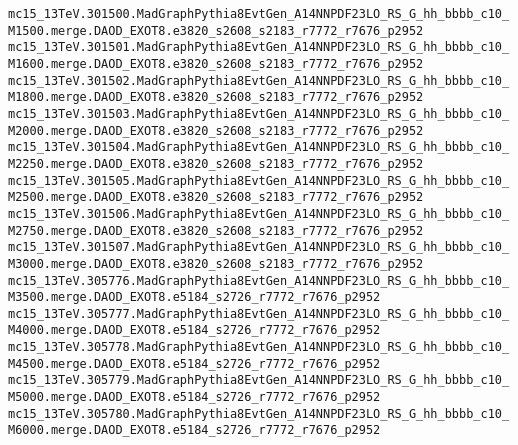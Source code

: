 {\verb|mc15_13TeV.301500.MadGraphPythia8EvtGen_A14NNPDF23LO_RS_G_hh_bbbb_c10_M1500.merge.DAOD_EXOT8.e3820_s2608_s2183_r7772_r7676_p2952|\\
\verb|mc15_13TeV.301501.MadGraphPythia8EvtGen_A14NNPDF23LO_RS_G_hh_bbbb_c10_M1600.merge.DAOD_EXOT8.e3820_s2608_s2183_r7772_r7676_p2952|\\
\verb|mc15_13TeV.301502.MadGraphPythia8EvtGen_A14NNPDF23LO_RS_G_hh_bbbb_c10_M1800.merge.DAOD_EXOT8.e3820_s2608_s2183_r7772_r7676_p2952|\\
\verb|mc15_13TeV.301503.MadGraphPythia8EvtGen_A14NNPDF23LO_RS_G_hh_bbbb_c10_M2000.merge.DAOD_EXOT8.e3820_s2608_s2183_r7772_r7676_p2952|\\
\verb|mc15_13TeV.301504.MadGraphPythia8EvtGen_A14NNPDF23LO_RS_G_hh_bbbb_c10_M2250.merge.DAOD_EXOT8.e3820_s2608_s2183_r7772_r7676_p2952|\\
\verb|mc15_13TeV.301505.MadGraphPythia8EvtGen_A14NNPDF23LO_RS_G_hh_bbbb_c10_M2500.merge.DAOD_EXOT8.e3820_s2608_s2183_r7772_r7676_p2952|\\
\verb|mc15_13TeV.301506.MadGraphPythia8EvtGen_A14NNPDF23LO_RS_G_hh_bbbb_c10_M2750.merge.DAOD_EXOT8.e3820_s2608_s2183_r7772_r7676_p2952|\\
\verb|mc15_13TeV.301507.MadGraphPythia8EvtGen_A14NNPDF23LO_RS_G_hh_bbbb_c10_M3000.merge.DAOD_EXOT8.e3820_s2608_s2183_r7772_r7676_p2952|\\
\verb|mc15_13TeV.305776.MadGraphPythia8EvtGen_A14NNPDF23LO_RS_G_hh_bbbb_c10_M3500.merge.DAOD_EXOT8.e5184_s2726_r7772_r7676_p2952|\\
\verb|mc15_13TeV.305777.MadGraphPythia8EvtGen_A14NNPDF23LO_RS_G_hh_bbbb_c10_M4000.merge.DAOD_EXOT8.e5184_s2726_r7772_r7676_p2952|\\
\verb|mc15_13TeV.305778.MadGraphPythia8EvtGen_A14NNPDF23LO_RS_G_hh_bbbb_c10_M4500.merge.DAOD_EXOT8.e5184_s2726_r7772_r7676_p2952|\\
\verb|mc15_13TeV.305779.MadGraphPythia8EvtGen_A14NNPDF23LO_RS_G_hh_bbbb_c10_M5000.merge.DAOD_EXOT8.e5184_s2726_r7772_r7676_p2952|\\
\verb|mc15_13TeV.305780.MadGraphPythia8EvtGen_A14NNPDF23LO_RS_G_hh_bbbb_c10_M6000.merge.DAOD_EXOT8.e5184_s2726_r7772_r7676_p2952|
}
\noindent

